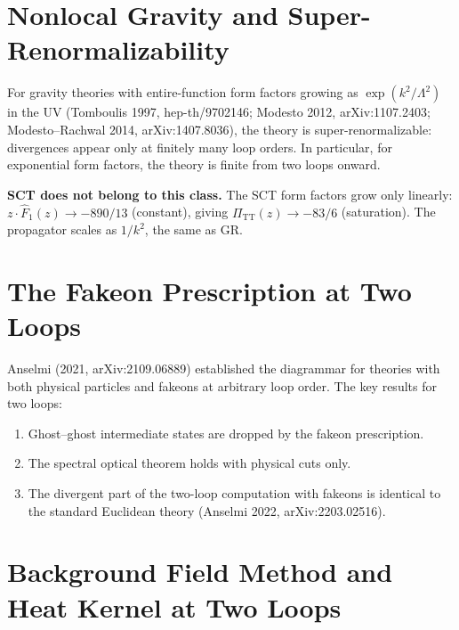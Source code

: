 \documentclass[12pt,a4paper]{article}
\begin{document}
\section{Nonlocal Gravity and Super-Renormalizability}

For gravity theories with entire-function form factors growing as
$\exp(k^2/\Lambda^2)$ in the UV (Tomboulis 1997, hep-th/9702146;
Modesto 2012, arXiv:1107.2403; Modesto--Rachwal 2014, arXiv:1407.8036),
the theory is super-renormalizable: divergences appear only at finitely
many loop orders. In particular, for exponential form factors, the theory
is finite from two loops onward.

\textbf{SCT does not belong to this class.} The SCT form factors grow only
linearly: $z \cdot \hat{F}_1(z) \to -890/13$ (constant), giving
$\Pi_{\text{TT}}(z) \to -83/6$ (saturation). The propagator scales as
$1/k^2$, the same as GR.

\section{The Fakeon Prescription at Two Loops}

Anselmi (2021, arXiv:2109.06889) established the diagrammar for theories
with both physical particles and fakeons at arbitrary loop order. The key
results for two loops:
\begin{enumerate}
  \item Ghost--ghost intermediate states are dropped by the fakeon
    prescription.
  \item The spectral optical theorem holds with physical cuts only.
  \item The divergent part of the two-loop computation with fakeons is
    identical to the standard Euclidean theory
    (Anselmi 2022, arXiv:2203.02516).
\end{enumerate}

\section{Background Field Method and Heat Kernel at Two Loops}
\end{document}
